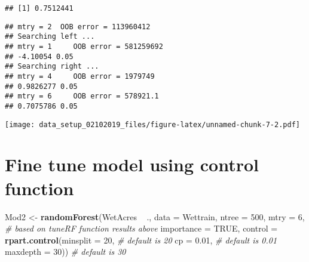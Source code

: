 \documentclass[]{article}
\newenvironment{Shaded}{\begin{snugshade}}{\end{snugshade}}
\newcommand{\KeywordTok}[1]{\textcolor[rgb]{0.13,0.29,0.53}{\textbf{{#1}}}}
\newcommand{\DataTypeTok}[1]{\textcolor[rgb]{0.13,0.29,0.53}{{#1}}}
\newcommand{\DecValTok}[1]{\textcolor[rgb]{0.00,0.00,0.81}{{#1}}}
\newcommand{\FloatTok}[1]{\textcolor[rgb]{0.00,0.00,0.81}{{#1}}}
\newcommand{\StringTok}[1]{\textcolor[rgb]{0.31,0.60,0.02}{{#1}}}
\newcommand{\CommentTok}[1]{\textcolor[rgb]{0.56,0.35,0.01}{\textit{{#1}}}}
\newcommand{\OtherTok}[1]{\textcolor[rgb]{0.56,0.35,0.01}{{#1}}}
\newcommand{\NormalTok}[1]{{#1}}
\begin{document}
\begin{verbatim}
## [1] 0.7512441
\end{verbatim}

\begin{Shaded}
\end{Shaded}

\begin{verbatim}
## mtry = 2  OOB error = 113960412 
## Searching left ...
## mtry = 1     OOB error = 581259692 
## -4.10054 0.05 
## Searching right ...
## mtry = 4     OOB error = 1979749 
## 0.9826277 0.05 
## mtry = 6     OOB error = 578921.1 
## 0.7075786 0.05
\end{verbatim}

\texttt{[image: data\_setup\_02102019\_files/figure-latex/unnamed-chunk-7-2.pdf]}

\section{Fine tune model using control
function}\label{fine-tune-model-using-control-function}

\begin{Shaded}
\begin{Highlighting}[]
\NormalTok{Mod2 <-}\StringTok{ }\KeywordTok{randomForest}\NormalTok{(WetAcres ~}\StringTok{ }\NormalTok{., }
                     \DataTypeTok{data =} \NormalTok{Wettrain, }
                     \DataTypeTok{ntree =} \DecValTok{500}\NormalTok{, }
                     \DataTypeTok{mtry =} \DecValTok{6}\NormalTok{,                                        }\CommentTok{# based on tuneRF function results above}
                     \DataTypeTok{importance =} \OtherTok{TRUE}\NormalTok{,}
                     \DataTypeTok{control =} \KeywordTok{rpart.control}\NormalTok{(}\DataTypeTok{minsplit =} \DecValTok{20}\NormalTok{,           }\CommentTok{# default is 20}
                                             \DataTypeTok{cp =} \FloatTok{0.01}\NormalTok{,               }\CommentTok{# default is 0.01}
                                             \DataTypeTok{maxdepth =} \DecValTok{30}\NormalTok{))          }\CommentTok{# default is 30}
\end{Highlighting}
\end{Shaded}
\end{document}
